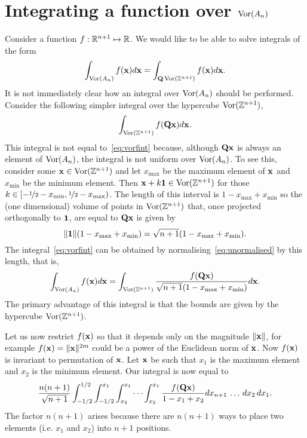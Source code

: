\documentclass[draftcls, onecolumn, 11pt]{IEEEtran}
\begin{document}
\section{Integrating a function over $\operatorname{Vor}(A_n)$}\label{sec:integr-funct-over}

Consider a function $f : {\mathbb R}^{n+1} \mapsto {\mathbb R}$.  We would like to be able to solve integrals of the form
\begin{equation}\label{eq:vorfint}
\int_{\vor(A_n)} f(\xbf) d\xbf = \int_{\Qbf\vor(\ints^{n+1})} f(\xbf) d\xbf.
\end{equation}
It is not immediately clear how an integral over $\operatorname{Vor}(A_n)$ should be performed.  Consider the following simpler integral over the hypercube $\operatorname{Vor}({\mathbb Z}^{n+1})$,
\begin{equation}\label{eq:unormalised}
\int_{\vor(\ints^{n+1})} f(\Qbf\xbf) d\xbf.
\end{equation}
This integral is not equal to~\eqref{eq:vorfint} because, although $\mathbf{Q}\mathbf{x}$ is always an element of $\operatorname{Vor}(A_n)$, the integral is not uniform over $\operatorname{Vor}(A_n)$.  To see this, consider some $\mathbf{x} \in \operatorname{Vor}({\mathbb Z}^{n+1})$ and let $x_{\text{max}}$ be the maximum element of $\mathbf{x}$ and $x_{\text{min}}$ be the minimum element.  Then $\mathbf{x} +  k \boldsymbol{1} \in \operatorname{Vor}({\mathbb Z}^{n+1})$ for those $k \in [-\nicefrac{1}{2} - x_{\text{min}}, \nicefrac{1}{2} - x_{\text{max}})$.  The length of this interval is $1 - x_{\text{max}} + x_{\text{min}}$ so the (one dimensional) volume of points in $\operatorname{Vor}({\mathbb Z}^{n+1})$ that, once projected orthogonally to $\boldsymbol{1}$, are equal to $\mathbf{Q}\mathbf{x}$ is given by
\[
\|\boldsymbol{1}\|(1 - x_{\text{max}} + x_{\text{min}}) = \sqrt{n+1}(1 - x_{\text{max}} + x_{\text{min}}).
\]
The integral~\eqref{eq:vorfint} can be obtained by normalising~\eqref{eq:unormalised} by this length, that is,
\[
\int_{\operatorname{Vor}(A_n)} f(\mathbf{x}) d\mathbf{x} =  \int_{\operatorname{Vor}({\mathbb Z}^{n+1})} \frac{f(\mathbf{Q}\mathbf{x})}{\sqrt{n+1}(1 - x_{\text{max}} + x_{\text{min}})}  d\mathbf{x}.
\]
The primary advantage of this integral is that the bounds are given by the hypercube $\operatorname{Vor}({\mathbb Z}^{n+1})$.

Let us now restrict $f(\mathbf{x})$ so that it depends only on the magnitude $\|\mathbf{x}\|$, for example $f(\mathbf{x}) = \|\mathbf{x}\|^{2m}$ could be a power of the Euclidean norm of $\mathbf{x}$.  Now $f(\mathbf{x})$ is invariant to permutation of $\mathbf{x}$.  Let $\mathbf{x}$ be such that $x_1$ is the maximum element and $x_2$ is the minimum element.  Our integral is now equal to
\[
\frac{n (n+1)}{\sqrt{n+1}} \int^{1/2}_{-1/2} \int^{x_1}_{-1/2}  \int^{x_1}_{x_2} \cdots \int^{x_1}_{x_2} \frac{f(\mathbf{Q}\mathbf{x})}{1 - x_{1} + x_{2}}  dx_{n+1} \, \dots \, dx_2 \, dx_1.
\]
The factor $n(n+1)$ arises because there are $n(n+1)$ ways to place two elements (i.e. $x_1$ and $x_2$) into $n+1$ positions.
\end{document}
